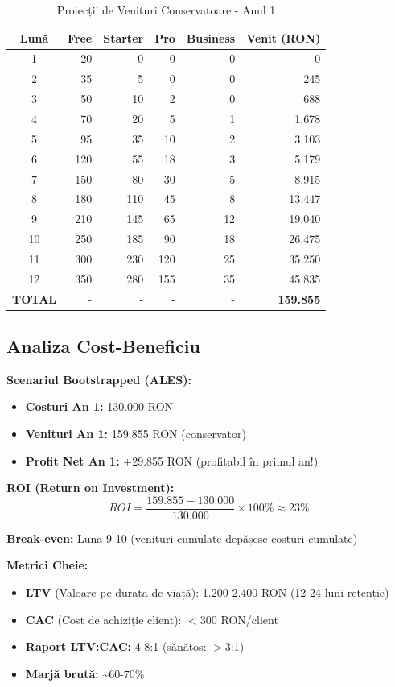 \documentclass[11pt,a4paper]{article}
\begin{document}
\begin{table}[H]
\centering
\small
\begin{tabular}{|c|r|r|r|r|r|}
\hline
\rowcolor{lightgray}
\textbf{Lună} & \textbf{Free} & \textbf{Starter} & \textbf{Pro} & \textbf{Business} & \textbf{Venit (RON)} \\
\hline
1 & 20 & 0 & 0 & 0 & 0 \\
2 & 35 & 5 & 0 & 0 & 245 \\
3 & 50 & 10 & 2 & 0 & 688 \\
4 & 70 & 20 & 5 & 1 & 1.678 \\
5 & 95 & 35 & 10 & 2 & 3.103 \\
6 & 120 & 55 & 18 & 3 & 5.179 \\
7 & 150 & 80 & 30 & 5 & 8.915 \\
8 & 180 & 110 & 45 & 8 & 13.447 \\
9 & 210 & 145 & 65 & 12 & 19.040 \\
10 & 250 & 185 & 90 & 18 & 26.475 \\
11 & 300 & 230 & 120 & 25 & 35.250 \\
12 & 350 & 280 & 155 & 35 & 45.835 \\
\hline
\rowcolor{lightgray}
\textbf{TOTAL} & - & - & - & - & \textbf{159.855} \\
\hline
\end{tabular}
\caption{Proiecții de Venituri Conservatoare - Anul 1}
\end{table}

\subsection{Analiza Cost-Beneficiu}

\textbf{Scenariul Bootstrapped (ALES):}

\begin{itemize}[nosep]
    \item \textbf{Costuri An 1:} 130.000 RON
    \item \textbf{Venituri An 1:} 159.855 RON (conservator)
    \item \textbf{Profit Net An 1:} +29.855 RON (profitabil în primul an!)
\end{itemize}

\textbf{ROI (Return on Investment):}
\[ ROI = \frac{159.855 - 130.000}{130.000} \times 100\% \approx 23\% \]

\textbf{Break-even:} Luna 9-10 (venituri cumulate depășesc costuri cumulate)

\textbf{Metrici Cheie:}
\begin{itemize}[nosep]
    \item \textbf{LTV} (Valoare pe durata de viață): 1.200-2.400 RON (12-24 luni retenție)
    \item \textbf{CAC} (Cost de achiziție client): $<$300 RON/client
    \item \textbf{Raport LTV:CAC:} 4-8:1 (sănătos: $>$3:1)
    \item \textbf{Marjă brută:} \textasciitilde60-70\%
\end{itemize}
\end{document}

